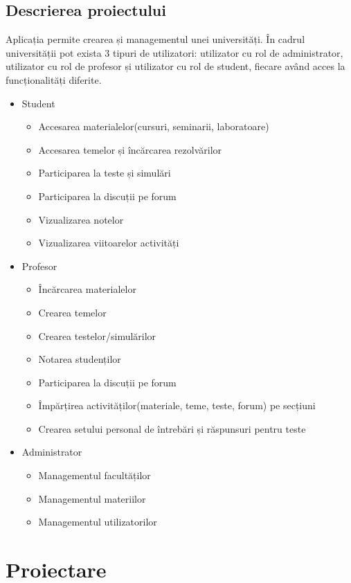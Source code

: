 \documentclass[12pt, a4paper, oneside, romanian]{teza-upb}
\begin{document}
\section{Descrierea proiectului}

Aplicația permite crearea și managementul unei universități. În cadrul universității pot exista 3 tipuri de utilizatori: utilizator cu rol de administrator, utilizator cu rol de profesor și utilizator cu rol de student, fiecare având acces la funcționalități diferite.
\begin{itemize}
	\item Student
		\begin{itemize}
			\item Accesarea materialelor(cursuri, seminarii, laboratoare)
			\item Accesarea temelor și încărcarea rezolvărilor
			\item Participarea la teste și simulări
			\item Participarea la discuții pe forum
			\item Vizualizarea notelor
			\item Vizualizarea viitoarelor activități
		\end{itemize}
	\item Profesor
		\begin{itemize}
			\item Încărcarea materialelor
			\item Crearea temelor
			\item Crearea testelor/simulărilor
			\item Notarea studenților
			\item Participarea la discuții pe forum
			\item Împărțirea activităților(materiale, teme, teste, forum) pe secțiuni
			\item Crearea setului personal de întrebări și răspunsuri pentru teste
		\end{itemize}
	\item Administrator
		\begin{itemize}
			\item Managementul facultăților
			\item Managementul materiilor
			\item Managementul utilizatorilor
		\end{itemize}
\end{itemize}

\null
\chapter{Proiectare}
\end{document}
